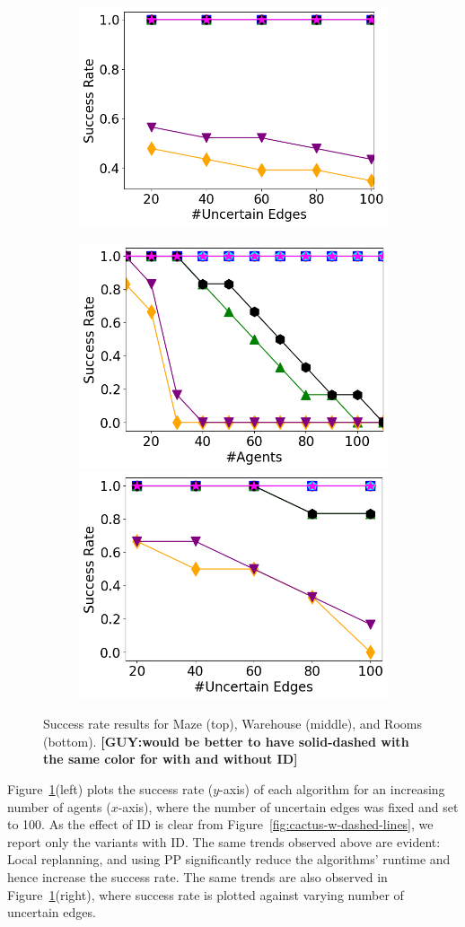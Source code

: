 \documentclass[letterpaper]{article} %
\def\
UrlFont{\rm}  %
\newcommand{\guy}[1]{\textbf{[\color{red}GUY:#1]}}
\theoremstyle{definition}
\begin{document}
{\begin{figure}[tbh]
\begin{subfigure}[b]{\columnwidth}
      \includegraphics[width=0.47\columnwidth]{Figures/warehouse/mixed_small_figures/Success-Rate(UEs)_k=40.png}
    \end{subfigure}
    \begin{subfigure}[b]{\columnwidth}\centering  
      \includegraphics[width=0.47\columnwidth]{Figures/room/mixed_small_figures/Success-Rate(k)_pos=100.png}
      \includegraphics[width=0.47\columnwidth]{Figures/room/mixed_small_figures/Success-Rate(UEs)_k=30.png}
    \end{subfigure}
    \caption{Success rate results for Maze (top), Warehouse (middle), and Rooms (bottom). \guy{would be better to have solid-dashed with the same color for with and without ID}}
    \label{fig:success-rate}
\end{figure}
}

Figure~\ref{fig:success-rate}(left) plots the success rate ($y$-axis) of each algorithm for an increasing number of agents ($x$-axis), where the number of uncertain edges was fixed and set to 100. As the effect of ID is clear from Figure~\ref{fig:cactus-w-dashed-lines}, we report only the variants with ID.
The same trends observed above are evident: Local replanning, and using PP  significantly reduce the algorithms' runtime and hence increase the success rate.  The same trends are also observed in Figure~\ref{fig:success-rate}(right), where success rate is plotted against varying number of uncertain edges. 
\end{document}
